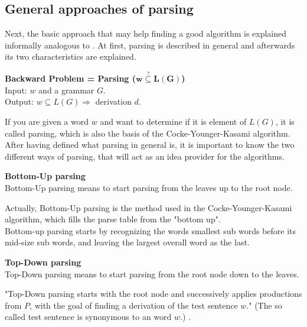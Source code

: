 \subsection{General approaches of parsing} \label{approaches}
Next, the basic approach that may help finding a good algorithm is explained informally analogous to \cite{Duda.2012}. At first, parsing is described in general and afterwards its two characteristics are explained.  
\begin{DefGrey}
	\textbf{Backward Problem = Parsing ($\mathbf{w\overset{?}{\subseteq}L(G)}$)}\\
	Input: $w$ and a grammar $G$. \\
	Output: $w \subseteq L(G) \Longrightarrow$ derivation $d$.
\end{DefGrey}
\noindent If you are given a word $w$ and want to determine if it is element of $L(G)$, it is called parsing, which is also the basis of the Cocke-Younger-Kasami algorithm.\\
After having defined what parsing in general is, it is important to know the two different ways of parsing, that will act as an idea provider for the algorithms.
\begin{mdframed}[backgroundcolor=defColour]
	\textbf{Bottom-Up parsing} \\
Bottom-Up parsing means to start parsing from the leaves up to the root node.
\end{mdframed}
\noindent Actually, Bottom-Up parsing is the method used in the Cocke-Younger-Kasami algorithm, which fills the parse table from the "bottom up"\cite{Duda.2012}.\\
Bottom-up parsing starts by recognizing the words smallest sub words before its mid-size sub words, and leaving the largest overall word as the last.
\begin{mdframed}[backgroundcolor=defColour]
	\textbf{Top-Down parsing} \\
	 Top-Down parsing means to start parsing from the root node down to the leaves.
\end{mdframed}
\noindent "Top-Down parsing starts with the root node and successively applies productions from $P$, with the goal of finding a derivation of the test sentence $w$." \cite{Duda.2012} (The so called test sentence is synonymous to an word $w$.) \cite{Duda.2012}.

